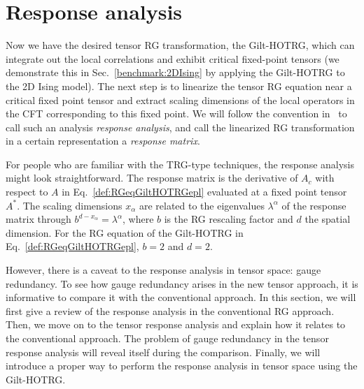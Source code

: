\documentclass[aps,prb,reprint,superscriptaddress]{revtex4-2}
\begin{document}
\section{Response analysis\label{diffRGeq}}
Now we have the desired tensor RG transformation, the Gilt-HOTRG, which
can integrate out the local correlations and exhibit critical
fixed-point tensors (we demonstrate this in Sec.~\ref{benchmark:2DIsing}
by applying the Gilt-HOTRG to the 2D Ising model). The next step is to
linearize the tensor RG equation near a critical fixed point tensor and
extract scaling dimensions of the local operators in the CFT
corresponding to this fixed point. We will follow the convention
in~\cite{kadanoff2014} to call such an analysis \textit{response
analysis}, and call the linearized RG transformation in a certain
representation a \textit{response matrix}.
%

For people who are familiar with the TRG-type techniques, the response
analysis might look straightforward. The response matrix is the
derivative of $A_c$ with respect to $A$ in
Eq.~\eqref{def:RGeqGiltHOTRGepl} evaluated at a fixed point tensor
$A^{*}$. The scaling dimensions $x_{\alpha}$ are related to the eigenvalues
$\lambda^{\alpha}$ of the response matrix through $b^{d-x_{\alpha}} =
\lambda^{\alpha}$, where $b$ is the RG rescaling factor and $d$ the
spatial dimension. For the RG equation of the Gilt-HOTRG in
Eq.~\eqref{def:RGeqGiltHOTRGepl}, $b = 2$ and $d = 2$. 
%

However, there is a caveat to the response analysis in tensor space: gauge
redundancy. To see how gauge redundancy arises in the new tensor
approach, it is informative to compare it with the conventional
approach. In this section, we will first give a review of the response
analysis in the conventional RG approach. Then, we move on to the tensor
response analysis and explain how it relates to the conventional
approach. The problem of gauge redundancy in the tensor response analysis will
reveal itself during the comparison. Finally, we will introduce a
proper way to perform the response analysis in tensor space using
the Gilt-HOTRG.
%
\end{document}
